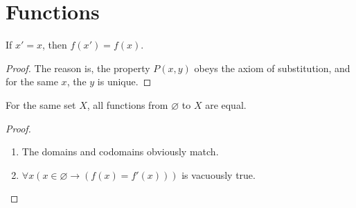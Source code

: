 \section{Functions}
\begin{why}{42}
	If $x'=x$, then $f(x')=f(x)$.
\end{why}
\begin{proof}
	The reason is, the property $P(x,y)$ obeys the axiom of substitution, and for the same $x$, the $y$ is unique.
\end{proof}

\begin{why}{43}
	For the same set $X$, all functions from $\varnothing$ to $X$ are equal.
\end{why}
\begin{proof}\leavevmode
	\begin{enumerate}
		\item The domains and codomains obviously match.
		\item $\forall x(x \in \varnothing \to (f(x) = f'(x)))$ is vacuously true.
	\end{enumerate}
\end{proof}

